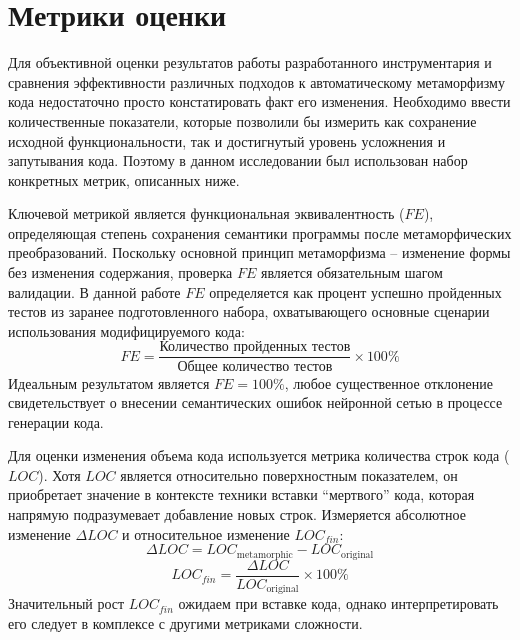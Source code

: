 \section{Метрики оценки}

Для объективной оценки результатов работы разработанного инструментария и сравнения эффективности различных подходов к автоматическому метаморфизму кода недостаточно просто констатировать факт его изменения. Необходимо ввести количественные показатели, которые позволили бы измерить как сохранение исходной функциональности, так и достигнутый уровень усложнения и запутывания кода. Поэтому в данном исследовании был использован набор конкретных метрик, описанных ниже.

Ключевой метрикой является функциональная эквивалентность ($FE$), определяющая степень сохранения семантики программы после метаморфических преобразований. Поскольку основной принцип метаморфизма – изменение формы без изменения содержания, проверка $FE$ является обязательным шагом валидации. В данной работе $FE$ определяется как процент успешно пройденных тестов из заранее подготовленного набора, охватывающего основные сценарии использования модифицируемого кода:
\begin{equation}
FE = \frac{\text{Количество пройденных тестов}}{\text{Общее количество тестов}} \times 100\%
\end{equation}
Идеальным результатом является $FE = 100\%$, любое существенное отклонение свидетельствует о внесении семантических ошибок нейронной сетью в процессе генерации кода.

Для оценки изменения объема кода используется метрика количества строк кода ($LOC$). Хотя $LOC$ является относительно поверхностным показателем, он приобретает значение в контексте техники вставки \enquote{мертвого} кода, которая напрямую подразумевает добавление новых строк. Измеряется абсолютное изменение $\Delta LOC$ и относительное изменение $LOC_{fin}$:
\begin{equation}
\Delta LOC = LOC_{\text{metamorphic}} - LOC_{\text{original}}
\end{equation}
\begin{equation}
LOC_{fin} = \frac{\Delta LOC}{LOC_{\text{original}}} \times 100\%
\end{equation}
Значительный рост $LOC_{fin}$ ожидаем при вставке кода, однако интерпретировать его следует в комплексе с другими метриками сложности.

